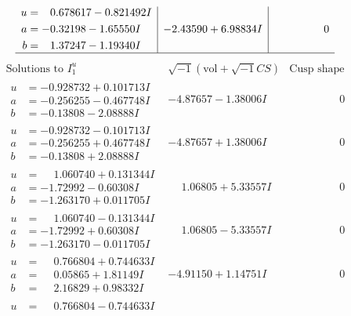 \documentclass[1p]{elsarticle_modified}
\theoremstyle{definition}
\newcommand{\I}{\sqrt{-1}}
\begin{document}
$$\begin{array}{c|c|c}
\begin{aligned}
u &= \phantom{-}0.678617 - 0.821492 I \\
a &= -0.32198 - 1.65550 I \\
b &= \phantom{-}1.37247 - 1.19340 I\end{aligned}
 & -2.43590 + 6.98834 I & \phantom{-0.000000 } 0\\
 \hline 
 \end{array}$$\newpage$$\begin{array}{c|c|c}  
\text{Solutions to }I^u_{1}& \I (\text{vol} + \sqrt{-1}CS) & \text{Cusp shape}\\
 \hline 
\begin{aligned}
u &= -0.928732 + 0.101713 I \\
a &= -0.256255 - 0.467748 I \\
b &= -0.13808 - 2.08888 I\end{aligned}
 & -4.87657 - 1.38006 I & \phantom{-0.000000 } 0 \\ \hline\begin{aligned}
u &= -0.928732 - 0.101713 I \\
a &= -0.256255 + 0.467748 I \\
b &= -0.13808 + 2.08888 I\end{aligned}
 & -4.87657 + 1.38006 I & \phantom{-0.000000 } 0 \\ \hline\begin{aligned}
u &= \phantom{-}1.060740 + 0.131344 I \\
a &= -1.72992 - 0.60308 I \\
b &= -1.263170 + 0.011705 I\end{aligned}
 & \phantom{-}1.06805 + 5.33557 I & \phantom{-0.000000 } 0 \\ \hline\begin{aligned}
u &= \phantom{-}1.060740 - 0.131344 I \\
a &= -1.72992 + 0.60308 I \\
b &= -1.263170 - 0.011705 I\end{aligned}
 & \phantom{-}1.06805 - 5.33557 I & \phantom{-0.000000 } 0 \\ \hline\begin{aligned}
u &= \phantom{-}0.766804 + 0.744633 I \\
a &= \phantom{-}0.05865 + 1.81149 I \\
b &= \phantom{-}2.16829 + 0.98332 I\end{aligned}
 & -4.91150 + 1.14751 I & \phantom{-0.000000 } 0 \\ \hline\begin{aligned}
u &= \phantom{-}0.766804 - 0.744633 I \\

\end{aligned}
\end{array}$$
\end{document}
